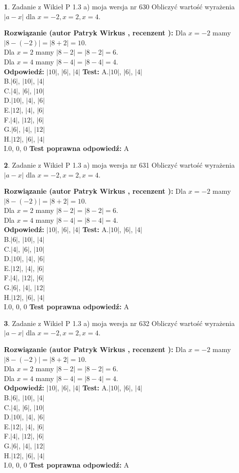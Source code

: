 \documentclass[12pt, a4paper]{article}
\theoremstyle{definition} %
\newtheorem{zad}{}
\newcommand{\zadStart}[1]{\begin{zad}#1\newline}
\newcommand{\zadStop}{\end{zad}}
\newcommand{\rozwStart}[2]{\noindent \textbf{Rozwiązanie (autor #1 , recenzent #2): }\newline}
\newcommand{\rozwStop}{\newline}
\newcommand{\odpStart}{\noindent \textbf{Odpowiedź:}\newline}
\newcommand{\odpStop}{\newline}
\newcommand{\testStart}{\noindent \textbf{Test:}\newline}
\newcommand{\testStop}{\newline}
\newcommand{\kluczStart}{\noindent \textbf{Test poprawna odpowiedź:}\newline}
\newcommand{\kluczStop}{\newline}
\begin{document}
\zadStart{Zadanie z Wikieł P 1.3 a) moja wersja nr 630}
Obliczyć wartość wyrażenia $|a - x|$ dla $x=-2,x=2,x=4$.
\zadStop
\rozwStart{Patryk Wirkus}{}
Dla $x = -2$ mamy $|8 - (-2)| = |8 + 2| = 10$.\\
Dla $x = 2$ mamy $|8 - 2| = |8 - 2| = 6$.\\
Dla $x = 4$ mamy $|8 - 4| = |8 - 4| = 4$.\\
\rozwStop
\odpStart
$|10|$, $|6|$, $|4|$
\odpStop
\testStart
A.$|10|$, $|6|$, $|4|$\\
B.$|6|$, $|10|$, $|4|$\\
C.$|4|$, $|6|$, $|10|$\\
D.$|10|$, $|4|$, $|6|$\\
E.$|12|$, $|4|$, $|6|$\\
F.$|4|$, $|12|$, $|6|$\\
G.$|6|$, $|4|$, $|12|$\\
H.$|12|$, $|6|$, $|4|$\\
I.$0$, $0$, $0$
\testStop
\kluczStart
A
\kluczStop



\zadStart{Zadanie z Wikieł P 1.3 a) moja wersja nr 631}
Obliczyć wartość wyrażenia $|a - x|$ dla $x=-2,x=2,x=4$.
\zadStop
\rozwStart{Patryk Wirkus}{}
Dla $x = -2$ mamy $|8 - (-2)| = |8 + 2| = 10$.\\
Dla $x = 2$ mamy $|8 - 2| = |8 - 2| = 6$.\\
Dla $x = 4$ mamy $|8 - 4| = |8 - 4| = 4$.\\
\rozwStop
\odpStart
$|10|$, $|6|$, $|4|$
\odpStop
\testStart
A.$|10|$, $|6|$, $|4|$\\
B.$|6|$, $|10|$, $|4|$\\
C.$|4|$, $|6|$, $|10|$\\
D.$|10|$, $|4|$, $|6|$\\
E.$|12|$, $|4|$, $|6|$\\
F.$|4|$, $|12|$, $|6|$\\
G.$|6|$, $|4|$, $|12|$\\
H.$|12|$, $|6|$, $|4|$\\
I.$0$, $0$, $0$
\testStop
\kluczStart
A
\kluczStop



\zadStart{Zadanie z Wikieł P 1.3 a) moja wersja nr 632}
Obliczyć wartość wyrażenia $|a - x|$ dla $x=-2,x=2,x=4$.
\zadStop
\rozwStart{Patryk Wirkus}{}
Dla $x = -2$ mamy $|8 - (-2)| = |8 + 2| = 10$.\\
Dla $x = 2$ mamy $|8 - 2| = |8 - 2| = 6$.\\
Dla $x = 4$ mamy $|8 - 4| = |8 - 4| = 4$.\\
\rozwStop
\odpStart
$|10|$, $|6|$, $|4|$
\odpStop
\testStart
A.$|10|$, $|6|$, $|4|$\\
B.$|6|$, $|10|$, $|4|$\\
C.$|4|$, $|6|$, $|10|$\\
D.$|10|$, $|4|$, $|6|$\\
E.$|12|$, $|4|$, $|6|$\\
F.$|4|$, $|12|$, $|6|$\\
G.$|6|$, $|4|$, $|12|$\\
H.$|12|$, $|6|$, $|4|$\\
I.$0$, $0$, $0$
\testStop
\kluczStart
A
\kluczStop
\end{document}
